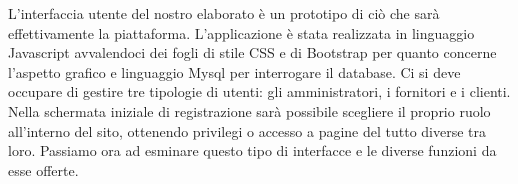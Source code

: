 L'interfaccia utente del nostro elaborato è un prototipo di ciò che sarà effettivamente la piattaforma.
L'applicazione è stata realizzata in linguaggio Javascript avvalendoci dei fogli di stile CSS e di Bootstrap per quanto concerne l'aspetto grafico e linguaggio Mysql per interrogare il database.
Ci si deve occupare di gestire tre tipologie di utenti: gli amministratori, i fornitori e i clienti.
Nella schermata iniziale di registrazione sarà possibile scegliere il proprio ruolo all'interno del sito, ottenendo privilegi o accesso a pagine del tutto diverse tra loro.
Passiamo ora ad esminare questo tipo di interfacce e le diverse funzioni da esse offerte.
